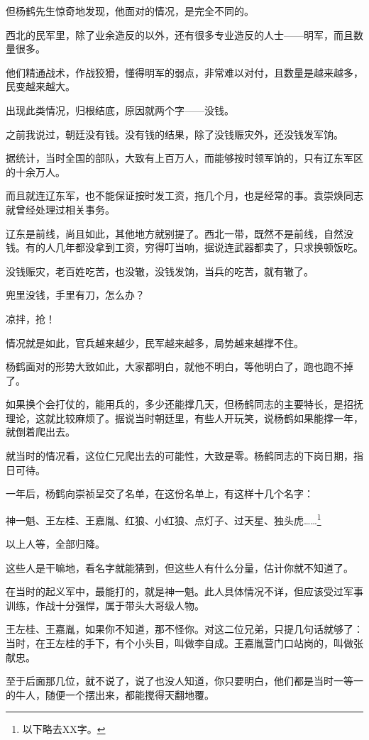 \begin{multicols}{\theparacolNo}
但杨鹤先生惊奇地发现，他面对的情况，是完全不同的。

西北的民军里，除了业余造反的以外，还有很多专业造反的人士——明军，而且数量很多。

他们精通战术，作战狡猾，懂得明军的弱点，非常难以对付，且数量是越来越多，民变越来越大。

出现此类情况，归根结底，原因就两个字——没钱。

之前我说过，朝廷没有钱。没有钱的结果，除了没钱赈灾外，还没钱发军饷。

据统计，当时全国的部队，大致有上百万人，而能够按时领军饷的，只有辽东军区的十余万人。

而且就连辽东军，也不能保证按时发工资，拖几个月，也是经常的事。袁崇焕同志就曾经处理过相关事务。

辽东是前线，尚且如此，其他地方就别提了。西北一带，既然不是前线，自然没钱。有的人几年都没拿到工资，穷得叮当响，据说连武器都卖了，只求换顿饭吃。

没钱赈灾，老百姓吃苦，也没辙，没钱发饷，当兵的吃苦，就有辙了。

兜里没钱，手里有刀，怎么办？

凉拌，抢！

情况就是如此，官兵越来越少，民军越来越多，局势越来越撑不住。

杨鹤面对的形势大致如此，大家都明白，就他不明白，等他明白了，跑也跑不掉了。

如果换个会打仗的，能用兵的，多少还能撑几天，但杨鹤同志的主要特长，是招抚理论，这就比较麻烦了。据说当时朝廷里，有些人开玩笑，说杨鹤如果能撑一年，就倒着爬出去。

就当时的情况看，这位仁兄爬出去的可能性，大致是零。杨鹤同志的下岗日期，指日可待。

一年后，杨鹤向崇祯呈交了名单，在这份名单上，有这样十几个名字：

神一魁、王左桂、王嘉胤、红狼、小红狼、点灯子、过天星、独头虎……\footnote{以下略去XX字。}

以上人等，全部归降。

这些人是干嘛地，看名字就能猜到，但这些人有什么分量，估计你就不知道了。

在当时的起义军中，最能打的，就是神一魁。此人具体情况不详，但应该受过军事训练，作战十分强悍，属于带头大哥级人物。

王左桂、王嘉胤，如果你不知道，那不怪你。对这二位兄弟，只提几句话就够了：当时，在王左桂的手下，有个小头目，叫做李自成。王嘉胤营门口站岗的，叫做张献忠。

至于后面那几位，就不说了，说了也没人知道，你只要明白，他们都是当时一等一的牛人，随便一个摆出来，都能搅得天翻地覆。


\end{multicols}
